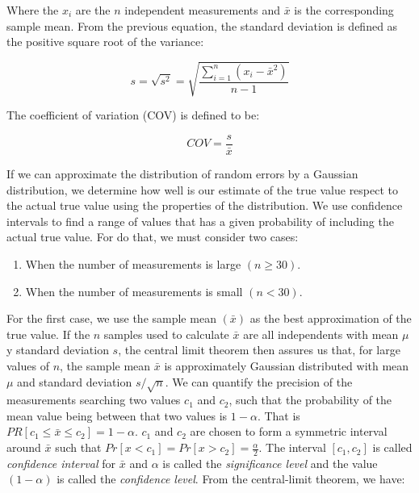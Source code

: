 \documentclass{latex/classes/thesis}
\begin{document}
Where the \(x_i\) are the \(n\) independent measurements and \(\bar{x}\) is
the corresponding sample mean. From the previous equation, the standard
deviation is defined as the positive square root of the variance:

\begin{equation}
s = \sqrt{s^2} = \sqrt{\frac{\sum_{i = 1}^n(x_i - \bar{x}^2)}{n - 1}}
\end{equation}

The coefficient of variation (COV) is defined to be:

\begin{equation}
  COV = \frac{s}{\bar{x}}
\end{equation}

If we can approximate the distribution of random errors by a Gaussian
distribution, we determine how well is our estimate of the true value respect
to the actual true value using the properties of the distribution. We use
confidence intervals to find a range of values that has a given probability
of including the actual true value. For do that, we must consider two cases:

\begin{enumerate}
\item When the number of measurements is large \((n \ge 30)\).
\item When the number of measurements is small \((n < 30)\).
\end{enumerate}

For the first case, we use the sample mean \((\bar{x})\) as the best
approximation of the true value. If the \(n\) samples used to calculate
\(\bar{x}\) are all independents with mean \(\mu\) y standard deviation
\(s\), the central limit theorem then assures us that, for large values of
\(n\), the sample mean \(\bar{x}\) is approximately Gaussian distributed with
mean \(\mu\) and standard deviation \(s / \sqrt{n}\). We can quantify the
precision of the measurements searching two values \(c_1\) and \(c_2\), such
that the probability of the mean value being between that two values is \(1 -
   \alpha\). That is \(PR[c_1 \le \bar{x} \le c_2] = 1 - \alpha\). \(c_1\) and
\(c_2\) are chosen to form a symmetric interval around \(\bar{x}\) such that
\(Pr[x < c_1] = Pr[x > c_2] = \frac{\alpha}{2}\). The interval \([c_1, c_2]\)
is called \textit{confidence interval} for \(\bar{x}\) and \(\alpha\) is
called the \textit{significance level} and the value \((1 - \alpha)\) is
called the \textit{confidence level}. From the central-limit theorem, we
have:
\end{document}
